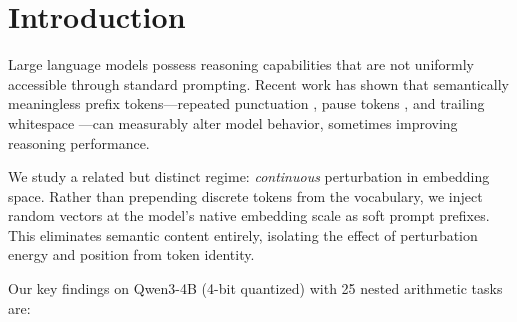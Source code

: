 \documentclass{article}
\begin{document}
\begin{abstract}
attention-sink-induced generation failures (14-word baseline collapse
$\to$ 650+ word complete plans across all five perturbation seeds),
and (2)~\emph{evolved} soft prompts (via a trained latent scorer +
evolutionary search) surface qualitatively different reasoning---security
frameworks, architectural patterns, and diagnostic strategies absent
from both baseline and random perturbation outputs.
Further cross-domain validation on twelve complex legal reasoning tasks
(blind-reviewed by an independent LLM judge) confirms that the best-of-5
perturbation output beats greedy baseline in 11/12 tasks (average
lift $+1.6$ on a 10-point expert-review scale). On tasks where greedy
decoding produces truncated or legally flawed analysis, perturbation
unlocks complete multi-jurisdictional reasoning the model possesses but
cannot access under standard generation. These results confirm that the
system is explicitly \emph{judge-heavy}: the perturbation mechanism
reliably accesses latent knowledge, and scorer/judge quality determines
how much of that ceiling is captured.
\end{abstract}

\section{Introduction} %

Large language models possess reasoning capabilities that are not
uniformly accessible through standard prompting. Recent work has shown
that semantically meaningless prefix tokens---repeated punctuation
\cite{shi2025}, pause tokens \cite{goyal2024}, and trailing whitespace
\cite{salinas2024}---can measurably alter model behavior, sometimes
improving reasoning performance.

We study a related but distinct regime: \emph{continuous} perturbation
in embedding space. Rather than prepending discrete tokens from the
vocabulary, we inject random vectors at the model's native embedding
scale as soft prompt prefixes. This eliminates semantic content entirely,
isolating the effect of perturbation energy and position from token
identity.

Our key findings on Qwen3-4B (4-bit quantized) with 25 nested arithmetic
tasks are:
\end{document}
